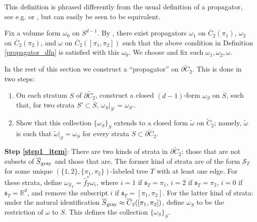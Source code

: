 \documentclass[11pt]{article}
\theoremstyle{definition}
\theoremstyle{remark}
\def\wt#1{\widetilde{#1}}
\def\ov#1{\overline{#1}}
\def\sgray{{\textnormal{gray}}}
\def\R{\mathbb{R}}
\def\fs{\mathfrak{s}}
\def\cS{\mathcal{S}}
\begin{document}
This definition is phrased differently from the usual definition of a propagator, see e.g. \cite[Definition 3.9]{Lescop} or \cite[Lemma 2.12]{WatanabeAddendum}, but can easily be seen to be equivalent. 

Fix a volume form $\omega_0$ on $S^{d-1}$. 
By \cite[Lemma 2.12]{WatanabeAddendum}, there exist propagators $\omega_1$ on $\ov{C}_2(\pi_1)$, $\omega_2$ on $\ov{C}_2(\pi_2)$, and $\omega$ on $\ov{C}_2([\pi_1,\pi_2])$ such that the above condition in Definition \ref{propagator_dfn} is satisfied with this $\omega_0$. We choose and fix such $\omega_1,\omega_2,\omega$. 

In the rest of this section we construct a ``propagator'' on $\partial\wt{C}_2$. 
This is done in two steps: 
\begin{enumerate}
\item \label{step1_item} On each stratum $S$ of $\partial\wt{C}_2$, construct a closed $(d-1)$-form $\omega_S$ on $\ov{S}$, such that, for two strata $S'\subset\ov{S}$, $\omega_S|_{\ov{S}'}=\omega_{S'}$. 
\item \label{step2_item} Show that this collection $\{\omega_S\}_S$ extends to a closed form $\wt\omega$ on $\wt{C}_2$; namely, $\wt\omega$ is such that $\wt\omega|_{S}=\omega_S$ for every strata $S\subset\partial\wt{C}_2$. 
\end{enumerate}

{\bf Step \ref{step1_item}}: 
There are two kinds of strata in $\partial\wt{C}_2$: those that are not subsets of $\ov{S}_{\sgray}$ and those that are. 
The former kind of strata are of the form $\cS_T$ for some unique $(\{1,2\},\{\pi_1,\pi_2\})$-labeled tree $T$ with at least one edge. 
For these strata, define $\omega_{\cS_T}=\hat{f}_T^*\omega_i$, where $i=1$ if $\fs_T=\pi_1$, $i=2$ if $\fs_T=\pi_2$, $i=0$ if $\fs_T=\R^d$, and remove the subscript $i$ if $\fs_T=[\pi_1,\pi_2]$. 
For the latter kind of strata: under the natural identification $\ov{S}_\sgray\approx\ov{C}_2([\pi_1,\pi_2])$, define $\omega_S$ to be the restriction of $\omega$ to $S$. 
This defines the collection $\{\omega_S\}_{S}$.
\end{document}
